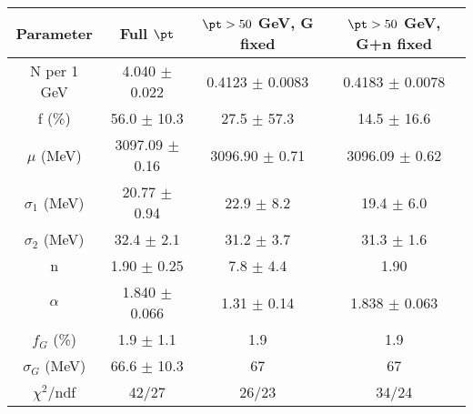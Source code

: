 \begin{tabular}{c||c|c|c}
Parameter & Full $\pt$ & $\pt>50$ GeV, G fixed & $\pt>50$ GeV, G+n fixed \\
\hline
N per 1 GeV & 4.040 $\pm$ 0.022 & 0.4123 $\pm$ 0.0083 & 0.4183 $\pm$ 0.0078\\
f (\%) & 56.0 $\pm$ 10.3 & 27.5 $\pm$ 57.3 & 14.5 $\pm$ 16.6\\
$\mu$ (MeV) & 3097.09 $\pm$ 0.16 & 3096.90 $\pm$ 0.71 & 3096.09 $\pm$ 0.62\\
$\sigma_1$ (MeV) & 20.77 $\pm$ 0.94 & 22.9 $\pm$ 8.2 & 19.4 $\pm$ 6.0\\
$\sigma_2$ (MeV) & 32.4 $\pm$ 2.1 & 31.2 $\pm$ 3.7 & 31.3 $\pm$ 1.6\\
n & 1.90 $\pm$ 0.25 & 7.8 $\pm$ 4.4 & 1.90\\
$\alpha$ & 1.840 $\pm$ 0.066 & 1.31 $\pm$ 0.14 & 1.838 $\pm$ 0.063\\
$f_G$ (\%) & 1.9 $\pm$ 1.1 & 1.9 & 1.9\\
$\sigma_G$ (MeV) & 66.6 $\pm$ 10.3 & 67 & 67\\
\hline
$\chi^2$/ndf & 42/27 & 26/23 & 34/24\\
\end{tabular}

